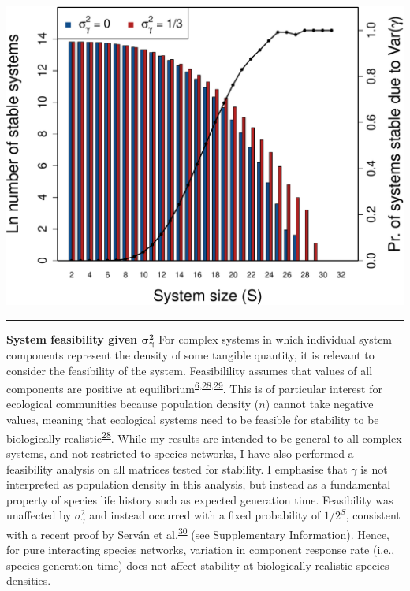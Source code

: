 \documentclass[]{article}
\begin{document}
\includegraphics{fig4.pdf}

\vspace{2mm}
\hrule


\textbf{System feasibility given \(\mathbf{\sigma^{2}_{\gamma}}\)} For
complex systems in which individual system components represent the
density of some tangible quantity, it is relevant to consider the
feasibility of the system. Feasibilility assumes that values of all
components are positive at
equilibrium\textsuperscript{\protect\hyperlink{ref-Grilli2017}{6},\protect\hyperlink{ref-Dougoud2018}{28},\protect\hyperlink{ref-Song2018}{29}}.
This is of particular interest for ecological communities because
population density (\(n\)) cannot take negative values, meaning that
ecological systems need to be feasible for stability to be biologically
realistic\textsuperscript{\protect\hyperlink{ref-Dougoud2018}{28}}.
While my results are intended to be general to all complex systems, and
not restricted to species networks, I have also performed a feasibility
analysis on all matrices tested for stability. I emphasise that
\(\gamma\) is not interpreted as population density in this analysis,
but instead as a fundamental property of species life history such as
expected generation time. Feasibility was unaffected by
\(\sigma^{2}_{\gamma}\) and instead occurred with a fixed probability of
\(1/2^{S}\), consistent with a recent proof by Serván et
al.\textsuperscript{\protect\hyperlink{ref-Servan2018}{30}} (see
Supplementary Information). Hence, for pure interacting species
networks, variation in component response rate (i.e., species generation
time) does not affect stability at biologically realistic species
densities.
\end{document}
